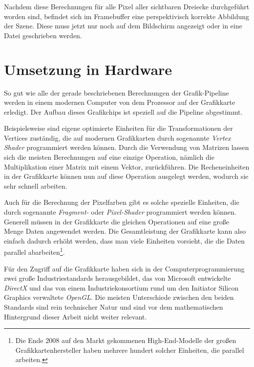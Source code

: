 Nachdem diese Berechnungen für alle Pixel aller sichtbaren Dreiecke durchgeführt worden sind, befindet sich im Framebuffer eine perspektivisch korrekte Abbildung der Szene. Diese muss jetzt nur noch auf dem Bildschirm angezeigt oder in eine Datei geschrieben werden.

\section{Umsetzung in Hardware}
\label{hardware}
So gut wie alle der gerade beschriebenen Berechnungen der Grafik-Pipeline werden in einem modernen Computer von dem Prozessor auf der Grafikkarte erledigt. Der Aufbau dieses Grafikchips ist speziell auf die Pipeline abgestimmt.

Beispielsweise sind eigene optimierte Einheiten für die Transformationen der Vertices zuständig, die auf modernen Grafikkarten durch sogenannte \emph{Vertex Shader} programmiert werden können. Durch die Verwendung von Matrizen lassen sich die meisten Berechnungen auf eine einzige Operation, nämlich die Multiplikation einer Matrix mit einem Vektor, zurückführen. Die Recheneinheiten in der Grafikkarte können nun auf diese Operation ausgelegt werden, wodurch sie sehr schnell arbeiten.

Auch für die Berechnung der Pixelfarben gibt es solche spezielle Einheiten, die durch sogenannte \emph{Fragment-} oder \emph{Pixel-Shader} programmiert werden können. Generell müssen in der Grafikkarte die gleichen Operationen auf eine große Menge Daten angewendet werden. Die Gesamtleistung der Grafikkarte kann also einfach dadurch erhöht werden, dass man viele Einheiten vorsieht, die die Daten parallel abarbeiten\footnote{Die Ende 2008 auf den Markt gekommenen High-End-Modelle der großen Grafikkartenhersteller haben mehrere hundert solcher Einheiten, die parallel arbeiten. }.

\label{direct3dopengl}
Für den Zugriff auf die Grafikkarte haben sich in der Computerprogrammierung zwei große Industriestandards herausgebildet, das von Microsoft entwickelte \emph{DirectX} und das von einem Industriekonsortium rund um den Initiator Silicon Graphics verwaltete \emph{OpenGL}. Die meisten Unterschiede zwischen den beiden Standards sind rein technischer Natur und sind vor dem mathematischen Hintergrund dieser Arbeit nicht weiter relevant.

